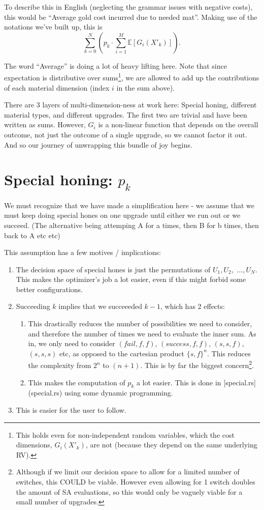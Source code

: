 \documentclass[a4paper,11pt]{article}
\begin{document}
To describe this in English (neglecting the grammar issues with negative costs), this would be ``Average gold cost incurred due to needed mat''. Making use of the notations we've built up, this is
$$
\sum^N_{k=0} (p_k  \cdot \sum^M_{i=1}  \mathbb{E}[  G_i(X'_k)  ]).
$$

 The word ``Average'' is doing a lot of heavy lifting here. Note that since expectation is distributive over sums\footnote{This holds even for non-independent random variables, which the cost dimensions, $G_i(X'_k)$, are not (because they depend on the same underlying RV). }, we are allowed to add up the contributions of each material dimension (index $i$ in the sum above). 
 
There are 3 layers of multi-dimension-ness at work here: Special honing, different material types, and different upgrades. The first two are trivial and have been written as sums. However, $G_i$ is a non-linear function that depends on the overall outcome, not just the outcome of a single upgrade, so we cannot factor it out. And so our journey of unwrapping this bundle of joy begins.

\section{Special honing: $p_k$}\label{special_section}

 We must recognize that we have made a simplification here - we assume that we must keep doing special hones on one upgrade until either we run out or we succeed. (The alternative being attemping A for a times, then B for b times, then back to A etc etc)

This assumption has a few motives / implications:
\begin{enumerate}

\item The decision space of special hones is just the permutations of $ U_1, U_2,$ $\ldots , U_N$. This makes the optimizer's job a lot easier, even if this might forbid some better configurations.
\item Succeeding $k$ implies that we succeeeded $k-1$, which has 2 effects:
\begin{enumerate}
  \item This drastically reduces the number of possibilities we need to consider, and therefore the number of times we need to evaluate the inner sum. As in, we only need to consider $(fail, f, f)$, $(success, f, f )$, $(s, s, f)$, $(s, s, s)$ etc, as opposed to the cartesian product $\{s,f\}^n$. This reduces the complexity from $2^n$ to $(n+1)$. This is by far the biggest concern\footnote{Although if we limit our decision space to allow for a limited number of switches, this COULD be viable. However even allowing for 1 switch doubles the amount of SA evaluations, so this would only be vaguely viable for a small number of upgrades.}.
  \item This makes the computation of $p_k$ a lot easier. This is done in [special.rs](special.rs) using some dynamic programming.
    \end{enumerate}
  \item This is easier for the user to follow.
  
\end{enumerate}
\end{document}
